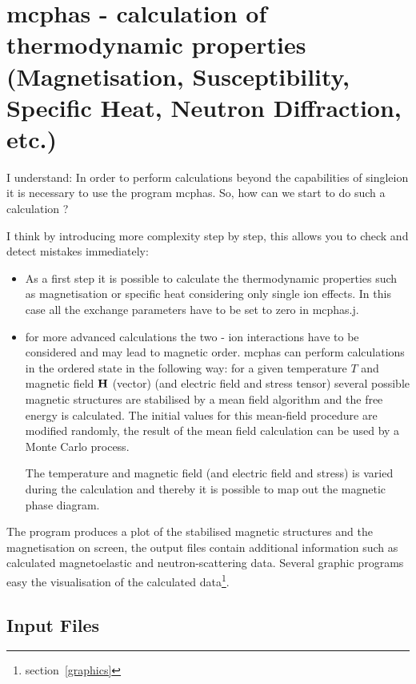 \section{{\prg mcphas} - calculation of thermodynamic properties (Magnetisation, Susceptibility, Specific Heat, Neutron %
Diffraction, etc.)}
\label{runmcphas}

\OO I understand:
In order to perform calculations beyond the capabilities of {\prg singleion} it is necessary
to use the program {\prg mcphas}. 
So, how can we start to do such a calculation ?

\EE I think by introducing more complexity step by step, this allows you to check and detect 
mistakes immediately:
\begin{itemize}
\item As a first step it is possible to
calculate the thermodynamic properties such as magnetisation or specific heat
considering only single ion effects. In this case all the exchange parameters
have to be set to zero in {\prg mcphas.j}. 
\item for more advanced calculations the two - ion interactions have to be
considered and may lead to magnetic order. {\prg mcphas} can perform 
calculations in the ordered state in the following way: for 
a given temperature $T$ and magnetic field $\mathbf H$ (vector)
(and electric field and stress tensor) several possible magnetic structures are stabilised
by a mean field algorithm and the free energy is 
calculated. The initial values for this mean-field procedure are
modified randomly, the result of the mean field calculation can be used by a Monte Carlo process.


The temperature and magnetic field (and electric field and stress) is varied during the calculation
and thereby it is possible to map out the magnetic phase diagram.
\end{itemize}

The program produces a plot of the stabilised magnetic
structures and the magnetisation on screen, the
output files contain additional information 
such as calculated magnetoelastic and  neutron-scattering
data. Several graphic programs easy the visualisation of the
calculated data\footnote{section~\ref{graphics}}.



\subsection{Input Files}

